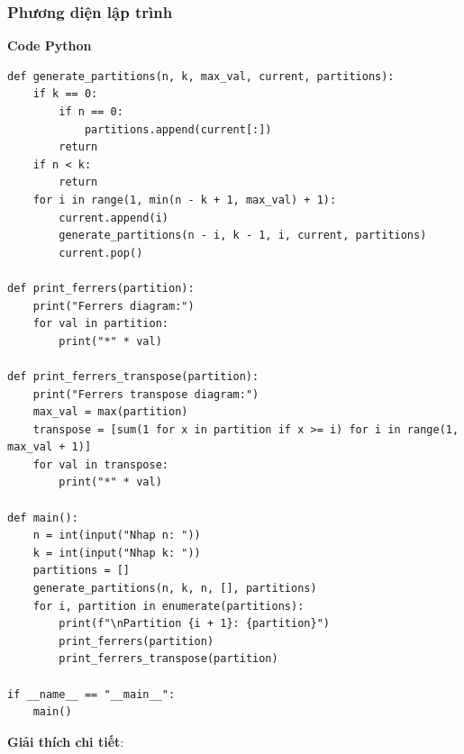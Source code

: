 \documentclass[a4paper,12pt]{article}
\begin{document}
\subsubsection{Phương diện lập trình}
\textbf{Code Python}
\begin{lstlisting}
def generate_partitions(n, k, max_val, current, partitions):
    if k == 0:
        if n == 0:
            partitions.append(current[:])
        return
    if n < k:
        return
    for i in range(1, min(n - k + 1, max_val) + 1):
        current.append(i)
        generate_partitions(n - i, k - 1, i, current, partitions)
        current.pop()

def print_ferrers(partition):
    print("Ferrers diagram:")
    for val in partition:
        print("*" * val)

def print_ferrers_transpose(partition):
    print("Ferrers transpose diagram:")
    max_val = max(partition)
    transpose = [sum(1 for x in partition if x >= i) for i in range(1, max_val + 1)]
    for val in transpose:
        print("*" * val)

def main():
    n = int(input("Nhap n: "))
    k = int(input("Nhap k: "))
    partitions = []
    generate_partitions(n, k, n, [], partitions)
    for i, partition in enumerate(partitions):
        print(f"\nPartition {i + 1}: {partition}")
        print_ferrers(partition)
        print_ferrers_transpose(partition)

if __name__ == "__main__":
    main()
\end{lstlisting}
\textbf{Giải thích chi tiết}:
\end{document}

